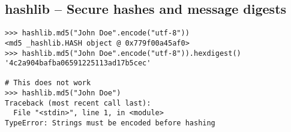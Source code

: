 \subsection{hashlib -- Secure hashes and message digests}
\begin{verbatim}
>>> hashlib.md5("John Doe".encode("utf-8"))
<md5 _hashlib.HASH object @ 0x779f00a45af0>
>>> hashlib.md5("John Doe".encode("utf-8")).hexdigest()
'4c2a904bafba06591225113ad17b5cec'

# This does not work
>>> hashlib.md5("John Doe")
Traceback (most recent call last):
  File "<stdin>", line 1, in <module>
TypeError: Strings must be encoded before hashing
\end{verbatim}
%
